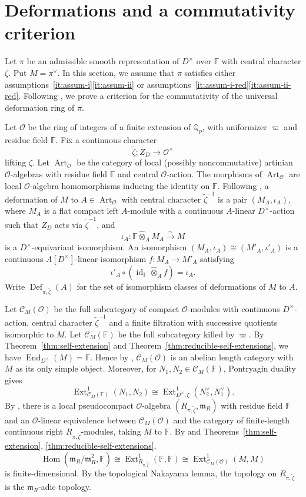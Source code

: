 \documentclass[11pt,a4paper]{article} %
\def\FF{\mathbb{F}}
\def\cC{\mathcal{C}}
\def\cO{\mathcal{O}}
\def\Art{\operatorname{Art}}
\def\End{\operatorname{End}}
\def\Ext{\operatorname{Ext}} %
\def\Hom{\operatorname{Hom}}
\def\id{\operatorname{id}}
\def\Qp{\mathbb{Q}_p}
\begin{document}
\section{Deformations and a commutativity criterion}\label{sec:deformations}

Let $\pi$ be an admissible smooth representation of $D^{\times}$ over $\FF$ with central character $\zeta$. Put $M=\pi^{\vee}$. In this section, we assume that $\pi$ satisfies either assumptions~\ref{it:assum-i}\ref{it:assum-ii} or assumptions~\ref{it:assum-i-red}\ref{it:assum-ii-red}. Following \cite{Pas13}, we prove a criterion for the commutativity of the universal deformation ring of $\pi$.

Let $\cO$ be the ring of integers of a finite extension of $\Qp$, with uniformizer $\varpi$ and residue field $\FF$. Fix a continuous character
\[
\widetilde\zeta:Z_D\longrightarrow\cO^\times
\]
lifting $\zeta$. Let $\Art_{\cO}$ be the category of local (possibly noncommutative) artinian $\cO$-algebras with residue field $\FF$ and central $\cO$-action. The morphisms of $\Art_{\cO}$ are local $\cO$-algebra homomorphisms inducing the identity on $\FF$. Following \cite[Definition 3.21]{Pas13}, a deformation of $M$ to $A\in\Art_{\cO}$ with central character $\widetilde{\zeta}^{-1}$ is a pair $(M_A,\iota_A)$, where $M_A$ is a flat compact left $A$-module with a continuous $A$-linear $D^\times$-action such that $Z_D$ acts via $\widetilde\zeta^{-1}$, and
\[
\iota_A:\FF\widehat\otimes_A M_A\xrightarrow{\sim}M
\]
is a $D^\times$-equivariant isomorphism. An isomorphism $(M_A,\iota_A)\cong(M'_A,\iota'_A)$ is a continuous $A[D^\times]$-linear isomorphism $f:M_A\to M'_A$ satisfying
\[
\iota'_A\circ(\id_\FF\widehat\otimes_A f)=\iota_A.
\]
Write $\operatorname{Def}_{\pi,\widetilde\zeta}(A)$ for the set of isomorphism classes of deformations of $M$ to $A$.

Let $\cC_M(\cO)$ be the full subcategory of compact $\cO$-modules with continuous $D^\times$-action, central character $\widetilde\zeta^{-1}$ and a finite filtration with successive quotients isomorphic to $M$. Let $\cC_M(\FF)$ be the full subcategory killed by $\varpi$. By Theorem~\ref{thm:self-extension} and Theorem~\ref{thm:reducible-self-extensions}, we have $\End_{D^\times}(M)=\FF$. Hence by \cite[Theorem 2.5]{Eno21}, $\cC_M(\cO)$ is an abelian length category with $M$ as its only simple object. Moreover, for $N_1,N_2\in\cC_M(\FF)$, Pontryagin duality gives
\[
\Ext^1_{\cC_M(\FF)}(N_1,N_2)
\cong\Ext^1_{D^\times,\zeta}(N_2^\vee,N_1^\vee).
\]
By \cite[IV, \S4, Th\'eor\`eme 4 and Corollaire 1]{Gab62}, there is a local pseudocompact $\cO$-algebra $(R_{\pi,\widetilde\zeta},\mathfrak{m}_R)$ with residue field $\FF$ and an $\cO$-linear equivalence between $\cC_M(\cO)$ and the category of finite-length continuous right $R_{\pi,\widetilde\zeta}$-modules, taking $M$ to $\FF$. By \cite[Lemma 3.16]{Pas13} and Theorems~\ref{thm:self-extension}, \ref{thm:reducible-self-extensions},
\[
\Hom(\mathfrak{m}_R/\overline{\mathfrak{m}_R^2},\FF)\cong\Ext^1_{R_{\pi,\widetilde\zeta}}(\FF,\FF)\cong\Ext^1_{\cC_M(\cO)}(M,M)
\]
is finite-dimensional. By the topological Nakayama lemma, the topology on $R_{\pi,\widetilde\zeta}$ is the $\mathfrak{m}_R$-adic topology.
\end{document}
